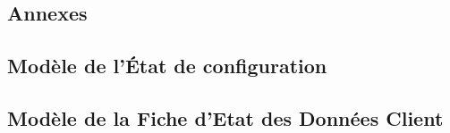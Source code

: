 \documentclass[asi]{picInsa}
\begin{document}
 \begin{appendix}
	\part*{Annexes}
	\chapter{Modèle de l'État de configuration}
	
	\chapter{Modèle de la Fiche d'Etat des Données Client}
	
	\listoffigures
	 
	\listoftables
 \end{appendix}

\newpage

\pageQuatriemeCouverture{}
\end{document}
